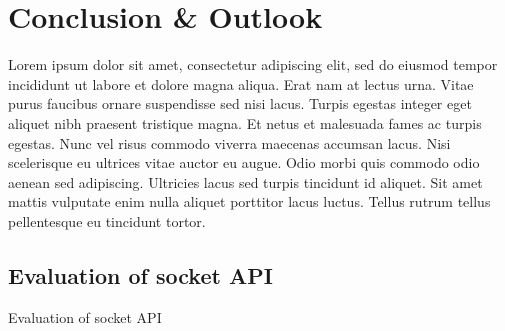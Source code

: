 %
%

\chapter{Conclusion \& Outlook}
Lorem ipsum dolor sit amet, consectetur adipiscing elit, sed do eiusmod tempor incididunt ut labore et dolore magna aliqua. Erat nam at lectus urna. Vitae purus faucibus ornare suspendisse sed nisi lacus. Turpis egestas integer eget aliquet nibh praesent tristique magna. Et netus et malesuada fames ac turpis egestas. Nunc vel risus commodo viverra maecenas accumsan lacus. Nisi scelerisque eu ultrices vitae auctor eu augue. Odio morbi quis commodo odio aenean sed adipiscing. Ultricies lacus sed turpis tincidunt id aliquet. Sit amet mattis vulputate enim nulla aliquet porttitor lacus luctus. Tellus rutrum tellus pellentesque eu tincidunt tortor.

\section{Evaluation of socket API}
Evaluation of socket API